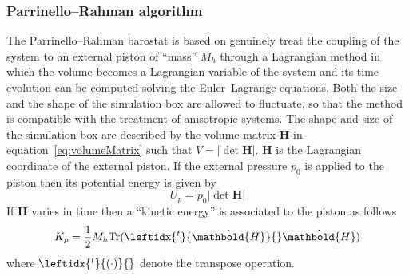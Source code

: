 \subsubsection{Parrinello--Rahman algorithm}
The Parrinello--Rahman barostat \cite{ParrinelloBarostat1}\cite{ParrinelloBarostat2} is based on genuinely treat
the coupling of the system to an external piston of ``mass'' $M_h$ through a Lagrangian method in which the
volume becomes a Lagrangian variable of the system and its time evolution can be computed solving the
Euler--Lagrange equations. Both the size and the shape of the simulation box are allowed to fluctuate, so that the 
method is compatible with the treatment of anisotropic systems. The shape and size of the simulation box are 
described by the volume matrix $ \mathbold{H}$ in equation~\eqref{eq:volumeMatrix} such that $V = 
|\det\mathbold{H}|$. $\mathbold{H}$ is the Lagrangian coordinate of the external piston. If the external pressure 
$p_0$ is applied to the piston then its potential energy is given by
\begin{equation*}
	U_p = p_0 |\det  \mathbold{H}|
\end{equation*}
If $ \mathbold{H}$ varies in time then a ``kinetic energy'' is associated to the piston as follows
\begin{equation*}
	K_p = \frac{1}{2}M_h \text{Tr}(\leftidx{^t}{\dot{ \mathbold{H}}}{} \dot{ \mathbold{H}} )
\end{equation*}
where $\leftidx{^t}{(\cdot)}{}$ denote the transpose operation.

